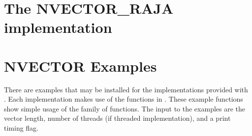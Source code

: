 \section{The NVECTOR\_RAJA implementation}\label{ss:nvec_raja}



\section{NVECTOR Examples}\label{ss:nvec_examples}

There are  examples that may be installed for the
implementations provided with {\sundials}. Each
implementation makes use of the functions in .
These example functions show simple usage of the  family
of functions. The input to the examples are the vector length, number
of threads (if threaded implementation), and a print timing flag.

